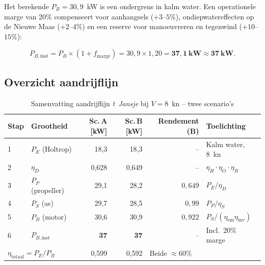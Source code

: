 Het berekende $P_B = 30{,}9$~kW is een ondergrens in kalm water. Een operationele marge
van 20\% compenseert voor aanhangsels ($+3$--$5\%$), ondiepwatereffecten op de Nieuwe
Maas ($+2$--$4\%$) en een reserve voor manoeuvreren en tegenwind ($+10$--$15\%$):
 
\begin{equation}
    P_{B,\mathrm{inst}} = P_B \times (1 + f_\mathrm{marge})
                        = 30{,}9 \times 1{,}20
                        = \mathbf{37{,}1}\ \mathbf{kW}
                        \approx \mathbf{37}\ \mathbf{kW}.
    \label{eq:PB-inst}
\end{equation}
 
\subsection{Overzicht aandrijflijn}
\label{subsec:aandrijflijn-overzicht}
 
\begin{table}[H]
    \centering
    \caption{Samenvatting aandrijflijn \emph{t~Jansje} bij $V = 8$~kn – twee scenario's}
    \label{tab:aandrijflijn-overzicht}
    \begin{tabular}{llrrrl}
        \toprule
        Stap & Grootheid & Sc.\,A [kW] & Sc.\,B [kW] & Rendement (B) & Toelichting \\
        \midrule
        1 & $P_E$ (Holtrop)            & 18{,}3 & 18{,}3 & –             & Kalm water, 8~kn \\
        2 & $\eta_D$                   & 0{,}628 & 0{,}649 & –            & $\eta_H \cdot \eta_O \cdot \eta_R$ \\
        3 & $P_P$ (propeller)          & 29{,}1 & 28{,}2 & $0{,}649$     & $P_E/\eta_D$ \\
        4 & $P_S$ (as)                 & 29{,}7 & 28{,}5 & $0{,}99$      & $P_P/\eta_S$ \\
        5 & $P_B$ (motor)              & 30{,}6 & 30{,}9 & $0{,}922$     & $P_S/(\eta_\mathrm{em}\eta_\mathrm{inv})$ \\
        6 & $P_{B,\mathrm{inst}}$      & \textbf{37} & \textbf{37} & – & Incl.\ 20\% marge \\
        \midrule
        \multicolumn{2}{l}{$\eta_\mathrm{totaal} = P_E/P_B$}
          & 0{,}599 & 0{,}592 & \multicolumn{2}{l}{Beide $\approx 60\%$} \\
        \bottomrule
    \end{tabular}
\end{table}
 
